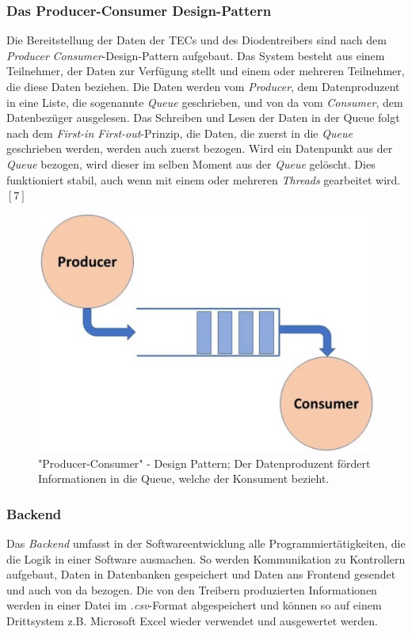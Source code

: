 \subsubsection{Das Producer-Consumer Design-Pattern}
\label{section:_producer_consumer}
Die Bereitstellung der Daten der TECs und des Diodentreibers sind nach dem \textit{Producer} \textit{Consumer}-Design-Pattern aufgebaut. Das System besteht aus einem Teilnehmer, der Daten zur Verfügung stellt und einem oder mehreren Teilnehmer, die diese Daten beziehen. Die Daten werden vom \textit{Producer}, dem Datenproduzent in eine Liste, die sogenannte \textit{Queue} geschrieben, und von da vom \textit{Consumer}, dem Datenbezüger ausgelesen. Das Schreiben und Lesen der Daten in der Queue folgt nach dem \textit{First-in First-out}-Prinzip, die Daten, die zuerst in die \textit{Queue} geschrieben werden, werden auch zuerst bezogen. Wird ein Datenpunkt aus der \textit{Queue} bezogen, wird dieser im selben Moment aus der \textit{Queue} gelöscht. Dies funktioniert stabil, auch wenn mit einem oder mehreren \textit{Threads} gearbeitet wird. $[7]$

\begin{figure}[H]
    \centering
    \includegraphics[scale=0.3]{98_images/producer_consumer_design_pattern.PNG}
    \caption{"Producer-Consumer" - Design Pattern; Der Datenproduzent fördert Informationen in die Queue, welche der Konsument bezieht.}
    \label{fig:_producer_consumer}
 \end{figure}

\subsubsection{Backend}
Das \textit{Backend} umfasst in der Softwareentwicklung alle Programmiertätigkeiten, die die Logik in einer Software ausmachen. So werden Kommunikation zu Kontrollern aufgebaut, Daten in Datenbanken gespeichert und Daten ans Frontend gesendet und auch von da bezogen.
Die von den Treibern produzierten Informationen werden in einer Datei im \textit{.csv}-Format abgespeichert und können so auf einem Drittsystem z.B. Microsoft Excel wieder verwendet und ausgewertet werden.

